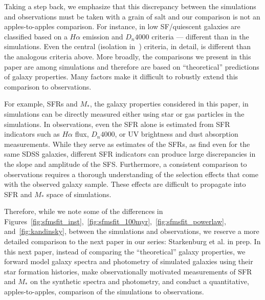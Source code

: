 \documentclass[tighten, preprint]{aastex62}
\begin{document}
Taking a step back, we emphasize that this discrepancy between the 
simulations and observations must be taken with a grain of salt and
our comparison is not an apples-to-apples comparison. For instance,
in \cite{geha2012} low SF/quiescent galaxies are classified based on 
a $H\alpha$ emission and $D_n 4000$ criteria --- different than in 
the simulations. Even the central (isolation in~\citealt{geha2012}) 
criteria, in detail, is different than the analogous criteria 
above. More broadly, the comparisons we present in this paper are 
among simulations and therefore are based on ``theoretical'' predictions 
of galaxy properties. Many factors make it difficult 
to robustly extend this comparison to observations. 

For example, SFRs and $M_*$, the galaxy properties considered in this paper, 
in simulations can be directly measured either using star or gas particles in 
the simulations. In observations, even the SFR alone is estimated from SFR indicators 
such as $H\alpha$ flux, $D_n 4000$, or UV brightness and dust absorption measurements. 
While they serve as estimates of the SFRs, as \cite{speagle2014} find even 
for the same SDSS galaxies, different SFR indicators can produce large 
discrepancies in the slope and amplitude of the SFS. Furthermore, a 
consistent comparison to observations requires a thorough understanding of 
the selection effects that come with the observed galaxy sample. These 
effects are difficult to propagate into SFR and $M_*$ space of simulations. 


Therefore, while we note some of the differences in 
Figures~\ref{fig:sfmsfit_inst},~\ref{fig:sfmsfit_100myr},~\ref{fig:sfmsfit_powerlaw}, 
and~\ref{fig:kandinsky}, between the simulations and observations,  
we reserve a more detailed comparison to the next paper in our 
series: Starkenburg et al. in prep. In this next paper, instead of
comparing the ``theoretical'' galaxy properties, we forward model galaxy 
spectra and photometry of simulated galaxies using their star formation 
histories, make observationally motivated measurements of SFR and $M_*$ on
the synthetic spectra and photometry, and conduct a quantitative, 
apples-to-apples, comparison of the simulations to observations.
\end{document}
